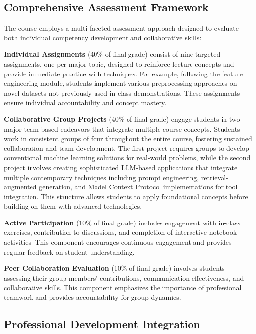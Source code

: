\documentclass{article}
\begin{document}
\subsection{Comprehensive Assessment Framework}

The course employs a multi-faceted assessment approach designed to evaluate both individual competency development and collaborative skills:

\textbf{Individual Assignments} (40\% of final grade) consist of nine targeted assignments, one per major topic, designed to reinforce lecture concepts and provide immediate practice with techniques. For example, following the feature engineering module, students implement various preprocessing approaches on novel datasets not previously used in class demonstrations. These assignments ensure individual accountability and concept mastery.

\textbf{Collaborative Group Projects} (40\% of final grade) engage students in two major team-based endeavors that integrate multiple course concepts. Students work in consistent groups of four throughout the entire course, fostering sustained collaboration and team development. The first project requires groups to develop conventional machine learning solutions for real-world problems, while the second project involves creating sophisticated LLM-based applications that integrate multiple contemporary techniques including prompt engineering, retrieval-augmented generation, and Model Context Protocol implementations for tool integration. This structure allows students to apply foundational concepts before building on them with advanced technologies.

\textbf{Active Participation} (10\% of final grade) includes engagement with in-class exercises, contribution to discussions, and completion of interactive notebook activities. This component encourages continuous engagement and provides regular feedback on student understanding.

\textbf{Peer Collaboration Evaluation} (10\% of final grade) involves students assessing their group members' contributions, communication effectiveness, and collaborative skills. This component emphasizes the importance of professional teamwork and provides accountability for group dynamics.

\subsection{Professional Development Integration}
\end{document}
